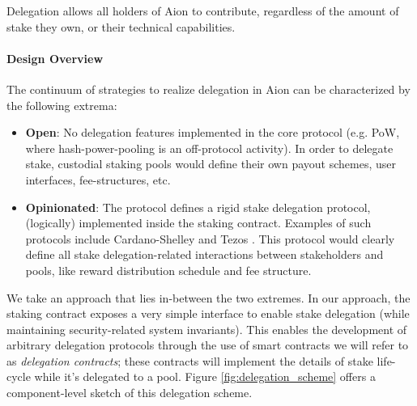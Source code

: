 Delegation allows all holders of Aion to contribute, regardless of the amount of stake they own, or their technical capabilities.

\paragraph{Design Overview}
The continuum of strategies to realize delegation in Aion can be characterized by the following extrema:
\begin{itemize}
    \item \textbf{Open}: No delegation features implemented in the core protocol (e.g. PoW, where hash-power-pooling is an off-protocol activity). In order to delegate stake, custodial staking pools would define their own payout schemes, user interfaces, fee-structures, etc. 
    \item \textbf{Opinionated}: The protocol defines a rigid stake delegation protocol, (logically) implemented inside the staking contract. Examples of such protocols include Cardano-Shelley \cite{KBC19} and Tezos \cite{Goo14}. This protocol would clearly define all stake delegation-related interactions between stakeholders and pools, like reward distribution schedule and fee structure.   
\end{itemize}

We take an approach that lies in-between the two extremes. In our approach, the staking contract exposes a very simple interface to enable stake delegation (while maintaining security-related system invariants). This enables the development of arbitrary delegation protocols through the use of smart contracts we will refer to as \textit{delegation contracts}; these contracts will implement the details of stake life-cycle  while it's delegated to a pool. Figure \ref{fig:delegation_scheme} offers a component-level sketch of this delegation scheme. 

